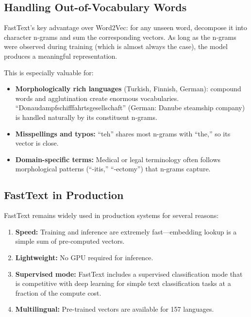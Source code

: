 \subsection{Handling Out-of-Vocabulary Words}

FastText's key advantage over Word2Vec: for any unseen word, decompose it into
character n-grams and sum the corresponding vectors.  As long as the n-grams
were observed during training (which is almost always the case), the model
produces a meaningful representation.

This is especially valuable for:
\begin{itemize}
    \item \textbf{Morphologically rich languages} (Turkish, Finnish, German):
    compound words and agglutination create enormous vocabularies.
    ``Donaudampfschifffahrtsgesellschaft'' (German: Danube steamship company)
    is handled naturally by its constituent n-grams.
    \item \textbf{Misspellings and typos:} ``teh'' shares most n-grams with
    ``the,'' so its vector is close.
    \item \textbf{Domain-specific terms:} Medical or legal terminology often
    follows morphological patterns (``-itis,'' ``-ectomy'') that n-grams
    capture.
\end{itemize}

\subsection{FastText in Production}

FastText remains widely used in production systems for several reasons:
\begin{enumerate}
    \item \textbf{Speed:} Training and inference are extremely fast---embedding
    lookup is a simple sum of pre-computed vectors.
    \item \textbf{Lightweight:} No GPU required for inference.
    \item \textbf{Supervised mode:} FastText includes a supervised
    classification mode that is competitive with deep learning for simple text
    classification tasks at a fraction of the compute cost.
    \item \textbf{Multilingual:} Pre-trained vectors are available for 157
    languages.
\end{enumerate}

